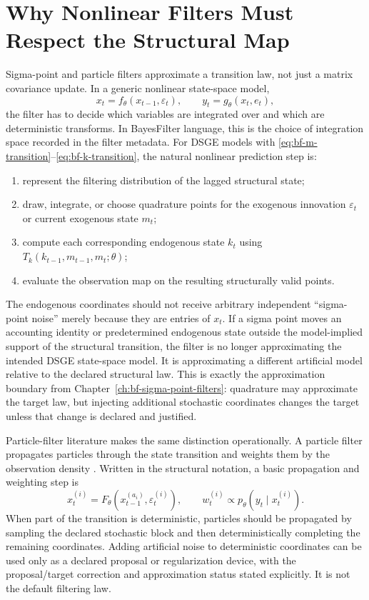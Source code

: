 \section{Why Nonlinear Filters Must Respect the Structural Map}
\label{sec:bf-nonlinear-filters-need-structural-map}

Sigma-point and particle filters approximate a transition law, not just a
matrix covariance update.  In a generic nonlinear state-space model,
\[
  x_t = f_\theta(x_{t-1}, \varepsilon_t),\qquad
  y_t = g_\theta(x_t, e_t),
\]
the filter has to decide which variables are integrated over and which are
deterministic transforms.  In BayesFilter language, this is the choice of
integration space recorded in the filter metadata.  For DSGE models with
\eqref{eq:bf-m-transition}--\eqref{eq:bf-k-transition}, the natural nonlinear
prediction step is:
\begin{enumerate}[label=(\roman*)]
  \item represent the filtering distribution of the lagged structural state;
  \item draw, integrate, or choose quadrature points for the exogenous
    innovation $\varepsilon_t$ or current exogenous state $m_t$;
  \item compute each corresponding endogenous state $k_t$ using
    $T_k(k_{t-1},m_{t-1},m_t;\theta)$;
  \item evaluate the observation map on the resulting structurally valid
    points.
\end{enumerate}
The endogenous coordinates should not receive arbitrary independent
``sigma-point noise'' merely because they are entries of $x_t$.  If a sigma
point moves an accounting identity or predetermined endogenous state outside
the model-implied support of the structural transition, the filter is no longer
approximating the intended DSGE state-space model.  It is approximating a
different artificial model relative to the declared structural law.  This is
exactly the approximation boundary from Chapter~\ref{ch:bf-sigma-point-filters}:
quadrature may approximate the target law, but injecting additional stochastic
coordinates changes the target unless that change is declared and justified.

Particle-filter literature makes the same distinction operationally.  A
particle filter propagates particles through the state transition and weights
them by the observation density \citep{gordon1993novel,doucet2001sequential,
andrieu2010particle}.  Written in the structural notation, a basic propagation
and weighting step is
\[
  x_t^{(i)} = F_\theta\!\left(x_{t-1}^{(a_i)},\varepsilon_t^{(i)}\right),
  \qquad
  w_t^{(i)} \propto p_\theta\!\left(y_t\mid x_t^{(i)}\right).
\]
When part of the transition is deterministic, particles should be propagated by
sampling the declared stochastic block and then deterministically completing the
remaining coordinates.  Adding artificial noise to deterministic coordinates can
be used only as a declared proposal or regularization device, with the
proposal/target correction and approximation status stated explicitly.  It is
not the default filtering law.

